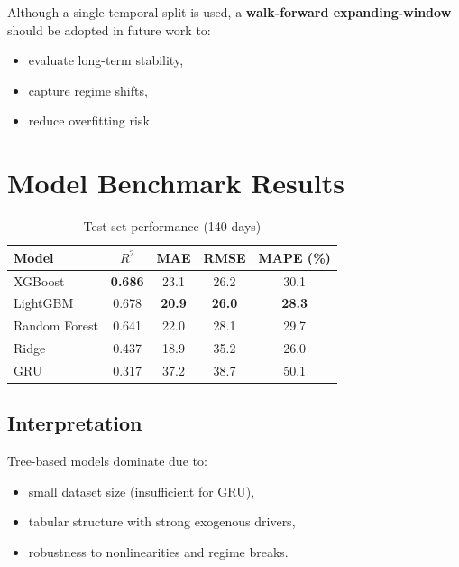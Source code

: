 \documentclass[11pt,a4paper]{article}
\begin{document}
Although a single temporal split is used, a \textbf{walk-forward expanding-window} should be adopted in future work to:
\begin{itemize}
    \item evaluate long-term stability,
    \item capture regime shifts,
    \item reduce overfitting risk.
\end{itemize}

\section{Model Benchmark Results}

\begin{table}[H]
\centering
\caption{Test-set performance (140 days)}
\begin{tabular}{lcccc}
\toprule
Model & $R^2$ & MAE & RMSE & MAPE (\%) \\
\midrule
XGBoost & \textbf{0.686} & 23.1 & 26.2 & 30.1 \\
LightGBM & 0.678 & \textbf{20.9} & \textbf{26.0} & \textbf{28.3} \\
Random Forest & 0.641 & 22.0 & 28.1 & 29.7 \\
Ridge & 0.437 & 18.9 & 35.2 & 26.0 \\
GRU & 0.317 & 37.2 & 38.7 & 50.1 \\
\bottomrule
\end{tabular}
\end{table}

\subsection{Interpretation}

Tree-based models dominate due to:
\begin{itemize}
    \item small dataset size (insufficient for GRU),
    \item tabular structure with strong exogenous drivers,
    \item robustness to nonlinearities and regime breaks.
\end{itemize}

\end{document}
